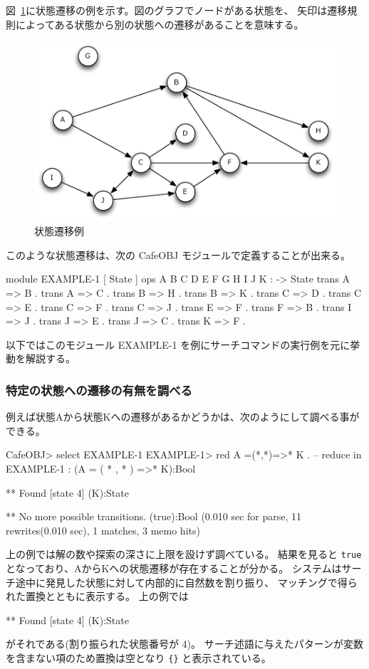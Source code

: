 \documentclass{article}
\begin{document}
図~\ref{fig:dfs2}に状態遷移の例を示す。図のグラフでノードがある状態を、
矢印は遷移規則によってある状態から別の状態への遷移があることを意味する。

\begin{figure}[htbp]
  \begin{center}
    \includegraphics[scale=0.6]{dfs2.pdf}
    \caption{{状態遷移例}}
    \label{fig:dfs2}
  \end{center}
\end{figure}

このような状態遷移は、次の CafeOBJ モジュールで定義することが出来る。

\begin{simplev}
module EXAMPLE-1 {
  [ State ]
  ops A B C D E F G H I J K : -> State
  trans A => B .
  trans A => C .
  trans B => H .
  trans B => K .
  trans C => D .
  trans C => E .
  trans C => F .
  trans C => J .
  trans E => F .
  trans F => B .
  trans I => J .
  trans J => E .
  trans J => C .
  trans K => F .
}
\end{simplev}
以下ではこのモジュール EXAMPLE-1 を例にサーチコマンドの実行例を元に挙動を解説する。

\subsubsection{特定の状態への遷移の有無を調べる}
例えば状態Aから状態Kへの遷移があるかどうかは、次のようにして調べる事ができる。

\begin{simplev}
CafeOBJ> select EXAMPLE-1
EXAMPLE-1> red A =(*,*)=>* K .
-- reduce in EXAMPLE-1 : (A = ( * , * ) =>* K):Bool

** Found [state 4] (K):State
   {}

** No more possible transitions.
(true):Bool
(0.010 sec for parse, 11 rewrites(0.010 sec), 1 matches, 3 memo hits)
\end{simplev}
上の例では解の数や探索の深さに上限を設けず調べている。
結果を見ると \texttt{true} となっており、AからKへの状態遷移が存在することが分かる。
システムはサーチ途中に発見した状態に対して内部的に自然数を割り振り、
マッチングで得られた置換とともに表示する。
上の例では
\begin{simplev}
** Found [state 4] (K):State
   {}
\end{simplev}
がそれである(割り振られた状態番号が 4)。
サーチ述語に与えたパターンが変数を含まない項のため置換は空となり \texttt{\{\}} と表示されている。
\end{document}
